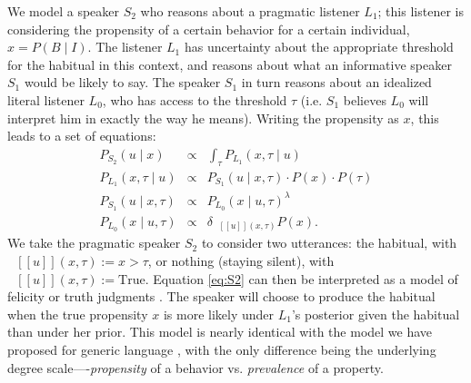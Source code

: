 \documentclass[10pt,letterpaper]{article}
\newcommand{\denote}[1]{\mbox{ $[\![ #1 ]\!]$}}
\newcommand{\ndg}[1]{\textcolor{Green}{[ndg: #1]}}
\begin{document}
We model a speaker $S_2$ who reasons about a pragmatic listener $L_1$; this listener is considering the propensity of a certain behavior for a certain individual, $x=P(B \mid I)$.
The listener $L_1$ has uncertainty about the appropriate threshold for the habitual in this context, and reasons about what an informative speaker $S_1$ would be likely to say. The speaker $S_1$ in turn reasons about an idealized literal listener $L_0$, who has access to the threshold $\tau$ (i.e. $S_1$ believes $L_0$ will interpret him in exactly the way he means). 
%
Writing the propensity as $x$, this leads to a set of equations:
\begin{eqnarray}
P_{S_{2}}(u \mid x) & \propto &  \int_{\tau} P_{L_{1}}(x , \tau \mid u) \label{eq:S2}\\
P_{L_{1}}(x , \tau \mid u) &\propto& P_{S_{1}}(u \mid x, \tau) \cdot P(x) \cdot P(\tau) \label{eq:L1}\\
P_{S_{1}}(u \mid x, \tau) &\propto&  {P_{L_{0}}(x \mid u, \tau)}^{\lambda} \label{eq:S1}\\
P_{L_{0}}(x \mid u, \tau) &\propto& {\delta_{\denote{u}(x, \tau)} P(x)}. \label{eq:L0}
\end{eqnarray}
We take the pragmatic speaker $S_2$ to consider two utterances: the habitual, with $\denote{u}(x, \tau) := x>\tau$, or nothing (staying silent), with $\denote{u}(x, \tau) := \text{True}$.
Equation \ref{eq:S2} can then be interpreted as a model of felicity or truth judgments \cite{Degen2014, TesslerUnderReview}.
The speaker will choose to produce the habitual when the true propensity $x$ is more likely under $L_1$'s posterior given the habitual than under her prior. 
This model is nearly identical with the model we have proposed for generic language \cite{TesslerUnderReview}, with the only difference being the underlying degree scale----\emph{propensity} of a behavior vs. \emph{prevalence} of a property. 
\end{document}

